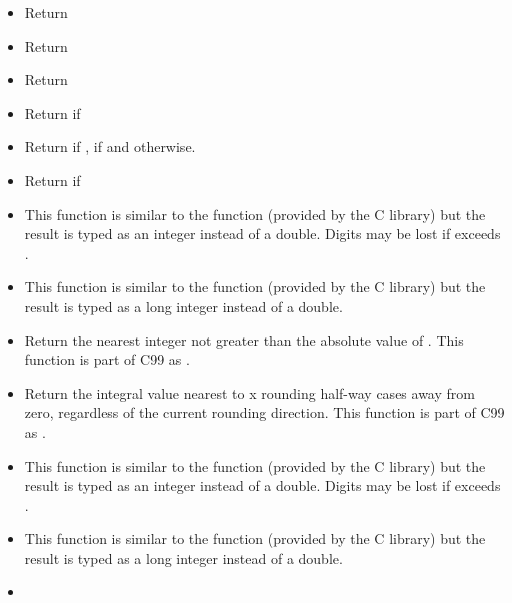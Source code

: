 \begin{itemize}
  \item {}
    \sshortdescribe Return 
  \item {}
    \sshortdescribe Return 
  \item {}
    \sshortdescribe Return 
  \item {}
    \sshortdescribe Return  if 
  \item {}
    \sshortdescribe Return  if ,  if 
    and  otherwise.
  \item {}
    \sshortdescribe Return  if 
  \item {}
    \sshortdescribe This function is similar to the  function
    (provided by the C library) but the result is typed as an integer instead of a
    double. Digits may be lost if  exceeds .
  \item {}
    \sshortdescribe This function is similar to the  function
    (provided by the C library) but the result is typed as a long integer instead of a
    double. 
  \item {}
    \sshortdescribe Return the nearest integer not greater than the absolute
    value of . This function is part of C99 as .
  \item {}
    \sshortdescribe Return the integral value nearest to x rounding
    half-way cases away from zero, regardless of the current rounding
    direction. This function is part of C99 as .
  \item {}
    \sshortdescribe This function is similar to the  function
    (provided by the C library) but the result is typed as an integer instead of a
    double. Digits may be lost if  exceeds .
  \item {}
    \sshortdescribe This function is similar to the  function
    (provided by the C library) but the result is typed as a long integer instead of a
    double. 
  \item {}

\end{itemize}
